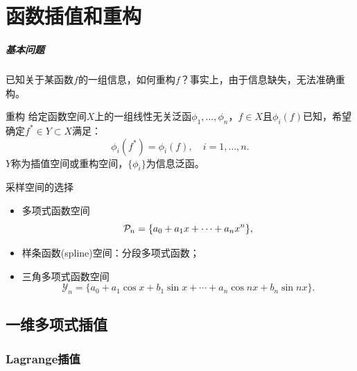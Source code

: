 \chapter{函数插值和重构}
\label{chap:interpolation}

\paragraph{基本问题}
已知关于某函数$f$的一组信息，如何重构$f$？事实上，由于信息缺失，无法准确重构。

\begin{definition}
    {重构}{}
    给定函数空间$X$上的一组线性无关泛函$\phi_1,\ldots,\phi_n$，$f \in X$且$\phi_i(f)$已知，希望确定$f^* \in Y \subset X$满足：
    \begin{equation}
        \phi_i(f^*) = \phi_i(f),\quad i = 1,\ldots,n.
    \end{equation}
    $Y$称为插值空间或重构空间，$\{\phi_i\}$为信息泛函。
\end{definition}


\begin{example}
    {采样空间的选择}{}
    \begin{itemize}
        \item 多项式函数空间
        \[
            \mathcal{P}_n = \{a_0 + a_1x + \cdots + a_nx^n\},
        \]
        \item 样条函数(spline)空间：分段多项式函数；
        \item 三角多项式函数空间
        \[
            \mathcal Y_n = \{a_0 + a_1\cos x + b_1\sin x + \cdots + a_n\cos nx + b_n\sin nx\}.
        \]
    \end{itemize}
\end{example}

\section{一维多项式插值}
\label{sec:1-D polynomial interpolation}

\subsection{Lagrange插值}

